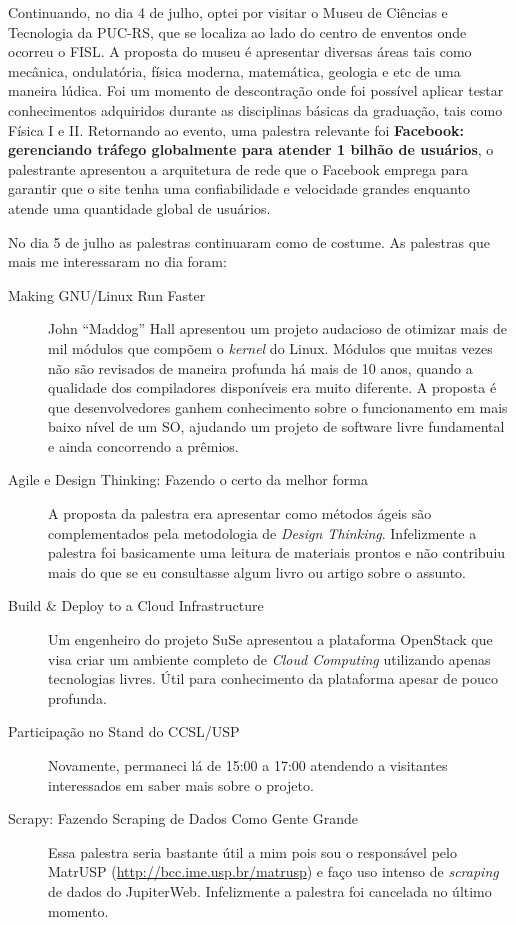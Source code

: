 \documentclass{article}
\begin{document}
Continuando, no dia 4 de julho, optei por visitar o Museu de Ciências e Tecnologia da PUC-RS, que se localiza ao lado do centro de enventos onde ocorreu o FISL. A proposta do museu é apresentar diversas áreas tais como mecânica, ondulatória, física moderna, matemática, geologia e etc de uma maneira lúdica. Foi um momento de descontração onde foi possível aplicar testar conhecimentos adquiridos durante as disciplinas básicas da graduação, tais como Física I e II. Retornando ao evento, uma palestra relevante foi \textbf{Facebook: gerenciando tráfego globalmente para atender 1 bilhão de usuários}, o palestrante apresentou a arquitetura de rede que o Facebook emprega para garantir que o site tenha uma confiabilidade e velocidade grandes enquanto atende uma quantidade global de usuários. 

No dia 5 de julho as palestras continuaram como de costume. As palestras que mais me interessaram no dia foram:

\begin{description}
	\item[Making GNU/Linux Run Faster] John ``Maddog'' Hall apresentou um projeto audacioso de otimizar mais de mil módulos que compõem o \emph{kernel} do Linux. Módulos que muitas vezes não são revisados de maneira profunda há mais de 10 anos, quando a qualidade dos compiladores disponíveis era muito diferente. A proposta é que desenvolvedores ganhem conhecimento sobre o funcionamento em mais baixo nível de um SO, ajudando um projeto de software livre fundamental e ainda concorrendo a prêmios.
	\item[Agile e Design Thinking: Fazendo o certo da melhor forma] A proposta da palestra era apresentar como métodos ágeis são complementados pela metodologia de \emph{Design Thinking}. Infelizmente a palestra foi basicamente uma leitura de materiais prontos e não contribuiu mais do que se eu consultasse algum livro ou artigo sobre o assunto.
	\item[Build \& Deploy to a Cloud Infrastructure] Um engenheiro do projeto SuSe apresentou a plataforma OpenStack que visa criar um ambiente completo de \emph{Cloud Computing} utilizando apenas tecnologias livres. Útil para conhecimento da plataforma apesar de pouco profunda.
	\item[Participação no Stand do CCSL/USP] Novamente, permaneci lá de 15:00 a 17:00 atendendo a visitantes interessados em saber mais sobre o projeto.
	\item[Scrapy: Fazendo Scraping de Dados Como Gente Grande] Essa palestra seria bastante útil a mim pois sou o responsável pelo MatrUSP (\url{http://bcc.ime.usp.br/matrusp}) e faço uso intenso de \emph{scraping} de dados do JupiterWeb. Infelizmente a palestra foi cancelada no último momento.
\end{description}
\end{document}
